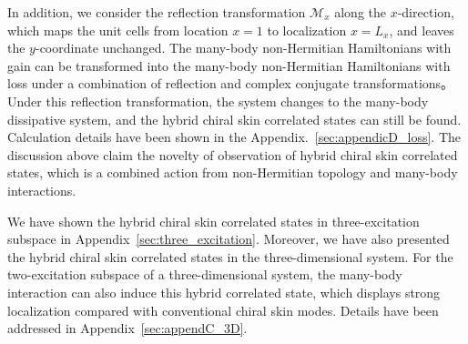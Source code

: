 \documentclass[longbibliography, aps, prx, amsmath, amssymb, amsfonts, twocolumn,superscriptaddress, footinbib]{revtex4-1}
\begin{document}
	In addition, we consider the reflection transformation $\mathcal{M}_x$ along the $x$-direction, which maps the unit cells from location $x = 1$ to localization $x = L_x$, and leaves the $y$-coordinate unchanged. 
	The many-body non-Hermitian Hamiltonians with gain can be transformed into the many-body non-Hermitian Hamiltonians with loss under a combination of reflection and complex conjugate transformations。
	Under this reflection transformation, the system changes to the many-body dissipative system, and the hybrid chiral skin correlated states can still be found. Calculation details have been shown in the Appendix.~\ref{sec:appendicD_loss}.
	The discussion above claim the novelty of observation of hybrid chiral skin correlated states, which is a combined action from non-Hermitian topology and many-body interactions.

	We have shown the hybrid chiral skin correlated states in three-excitation subspace in Appendix~\ref{sec:three_excitation}.
	Moreover, we have also presented the hybrid chiral skin correlated states in the three-dimensional system. For the two-excitation subspace of a three-dimensional system, the many-body interaction can also induce this hybrid correlated state, which displays strong localization compared with conventional chiral skin modes. Details have been addressed in Appendix~\ref{sec:appendC_3D}.

\end{document}
